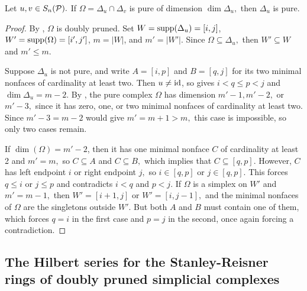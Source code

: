 \begin{lemma}
\label{lem:pure-intersection}
    Let $u,v\in S_n(\mathcal{P}).$ If $\Omega = \Delta_u\cap\Delta_v$ is pure of dimension $\dim\Delta_u,$ then $\Delta_u$ is pure.
\end{lemma}
\begin{proof}
    By , $\Omega$ is doubly pruned. Set $W = \mathrm{supp}(\Delta_u) = [i,j]$, $W' = \mathrm{supp}(\Omega) = [i',j']$, $m = |W|$, and $m' = |W'|.$ Since $\Omega\subseteq\Delta_u,$ then $W'\subseteq W$ and $m'\leq m.$

    Suppose $\Delta_u$ is not pure, and write $A = [i,p]$ and $B = [q,j]$ for its two minimal nonfaces of cardinality at least two. Then $u\neq\mathrm{id}$, so  gives $i<q\leq p<j$ and $\dim\Delta_u = m-2.$ By , the pure complex $\Omega$ has dimension $m'-1,m'-2,$ or $m'-3,$ since it has zero, one, or two minimal nonfaces of cardinality at least two. Since $m' - 3 = m - 2$ would give $m' = m + 1 > m,$ this case is impossible, so only two cases remain.

    If $\dim(\Omega) = m'-2$, then it has one minimal nonface $C$ of cardinality at least 2 and $m' = m,$ so $C\subseteq A$ and $C\subseteq B,$ which implies that $C\subseteq [q,p].$ However, $C$ has left endpoint $i$ or right endpoint $j,$ so $i\in[q,p]$ or $j\in[q,p].$ This forces $q\leq i$ or $j\leq p$ and contradicts $i<q$ and $p<j.$ If $\Omega$ is a simplex on $W'$ and $m' = m - 1,$ then $W' = [i+1,j]$ or $W' = [i,j-1],$ and the minimal nonfaces of $\Omega$ are the singletons outside $W'.$ But both $A$ and $B$ must contain one of them, which forces $q = i$ in the first case and $p = j$ in the second, once again forcing a contradiction.
\end{proof}


\subsection{The Hilbert series for the Stanley-Reisner rings of doubly pruned simplicial complexes}
\label{subsec:hilb}

